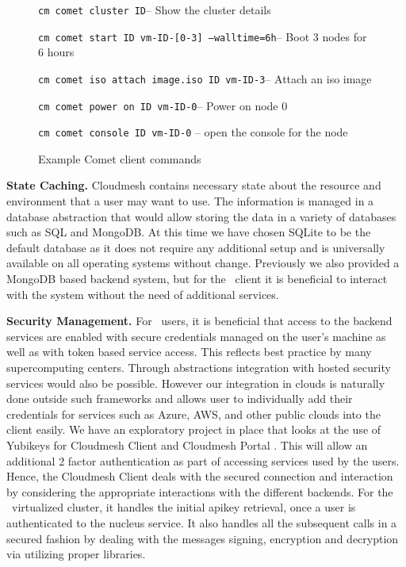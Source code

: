 \begin{figure}[!h]
\bigskip


{\tt cm comet cluster  ID}\newline -- Show the cluster details

{\tt cm comet start ID vm-ID-[0-3] --walltime=6h}\newline -- Boot 3 nodes for 6 hours

{\tt cm comet iso attach image.iso ID vm-ID-3}\newline -- Attach an iso image

{\tt cm comet power on ID vm-ID-0}\newline -- Power on node 0

{\tt cm comet console ID vm-ID-0}\newline
-- open the console for the node

\caption{Example Comet client commands}
\label{F:commands}
\end{figure}


\parindent 0pt { \bf State Caching.} Cloudmesh contains necessary state
about the resource and environment that a user may want to use.  The
information is managed in a database abstraction that would allow
storing the data in a variety of databases such as SQL and MongoDB. At
this time we have chosen SQLite to be the default database as it does
not require any additional setup and is universally available on all
operating systems without change. Previously we also provided a
MongoDB based backend system, but for the \Comet~client it is
beneficial to interact with the system without the need of additional
services.

{\parindent 0pt \bf Security Management.} For \Comet~users, it is
beneficial that access to the backend services are enabled with secure
credentials managed on the user's machine as well as with token based
service access.  This reflects best practice by many supercomputing
centers. Through abstractions integration with hosted security
services \cite{BasneyHW05} would also be possible.  However our
integration in clouds is naturally done outside such frameworks and
allows user to individually add their credentials for services such as
Azure, AWS, and other public clouds into the client easily. We have an
exploratory project in place that looks at the use of Yubikeys for
Cloudmesh Client and Cloudmesh Portal \cite{yubikey}. This will allow
an additional 2 factor authentication as part of accessing services
used by the users.  Hence, the Cloudmesh Client deals with the secured
connection and interaction by considering the appropriate interactions
with the different backends.  For the \Comet~virtualized cluster, it
handles the initial apikey retrieval, once a user is authenticated to
the nucleus service. It also handles all the subsequent calls in a
secured fashion by dealing with the messages signing, encryption and
decryption via utilizing proper libraries.

